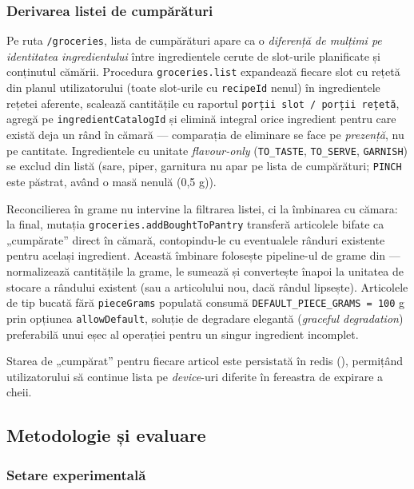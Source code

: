 \subsubsection{Derivarea listei de cumpărături}\label{subsec:lista-cumparaturi}

Pe ruta \texttt{/groceries}, lista de cumpărături apare ca o \textit{diferență de mulțimi pe identitatea ingredientului} între ingredientele cerute de slot-urile planificate și conținutul cămării. Procedura \texttt{groceries.list} expandează fiecare slot cu rețetă din planul utilizatorului (toate slot-urile cu \texttt{recipeId} nenul) în ingredientele rețetei aferente, scalează cantitățile cu raportul \texttt{porții slot / porții rețetă}, agregă pe \texttt{ingredientCatalogId} și elimină integral orice ingredient pentru care există deja un rând în cămară --- comparația de eliminare se face pe \textit{prezență}, nu pe cantitate. Ingredientele cu unitate \textit{flavour-only} (\texttt{TO\_TASTE}, \texttt{TO\_SERVE}, \texttt{GARNISH}) se exclud din listă (sare, piper, garnitura nu apar pe lista de cumpărături; \texttt{PINCH} este păstrat, având o masă nenulă (0,5 g)).

Reconcilierea în grame nu intervine la filtrarea listei, ci la îmbinarea cu cămara: la final, mutația \texttt{groceries.addBoughtToPantry} transferă articolele bifate ca „cumpărate” direct în cămară, contopindu-le cu eventualele rânduri existente pentru același ingredient. Această îmbinare folosește pipeline-ul de grame din  --- normalizează cantitățile la grame, le sumează și convertește înapoi la unitatea de stocare a rândului existent (sau a articolului nou, dacă rândul lipsește). Articolele de tip bucată fără \texttt{pieceGrams} populată consumă \texttt{DEFAULT\_PIECE\_GRAMS = 100} g prin opțiunea \texttt{allowDefault}, soluție de degradare elegantă (\textit{graceful degradation}) preferabilă unui eșec al operației pentru un singur ingredient incomplet.

Starea de „cumpărat” pentru fiecare articol este persistată în \gls{redis} (), permițând utilizatorului să continue lista pe \textit{device}-uri diferite în fereastra de expirare a cheii.

\subsection{Metodologie și evaluare}\label{ch:evaluare}

\subsubsection{Setare experimentală}\label{subsec:setare-experimentala}

